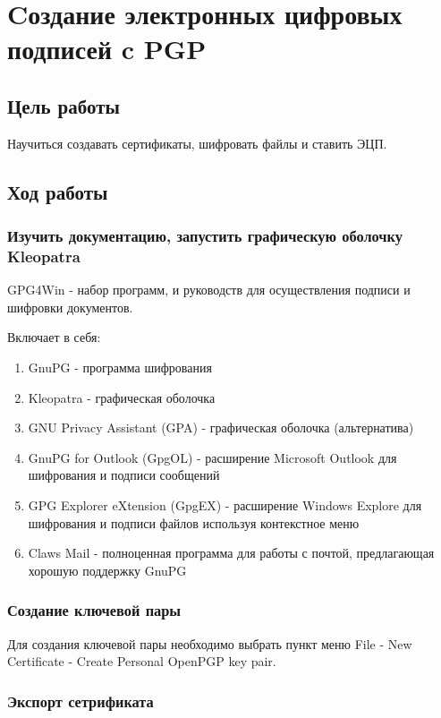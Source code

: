 \documentclass[a4paper, 12pt]{article}
\begin{document}
\newpage

\section{Cоздание электронных цифровых подписей c PGP}

\subsection{Цель работы}

Научиться создавать сертификаты, шифровать файлы и ставить ЭЦП.

\subsection{Ход работы}

\subsubsection{Изучить документацию, запустить графическую оболочку Kleopatra}

GPG4Win - набор программ, и руководств для осуществления подписи и шифровки документов.

Включает в себя:

\begin{enumerate}
\item GnuPG - программа шифрования
\item Kleopatra - графическая оболочка
\item GNU Privacy Assistant (GPA) - графическая оболочка (альтернатива)
\item GnuPG for Outlook (GpgOL) - расширение Microsoft Outlook для шифрования и подписи сообщений
\item GPG Explorer eXtension (GpgEX) - расширение Windows Explore для шифрования и подписи файлов используя контекстное меню
\item Claws Mail - полноценная программа для работы с почтой, предлагающая хорошую поддержку GnuPG
\end{enumerate}

\subsubsection{Создание ключевой пары}

Для создания ключевой пары необходимо выбрать пункт меню File - New Certificate - Create Personal OpenPGP key pair. 

\subsubsection{Экспорт сетрификата}
\end{document}
